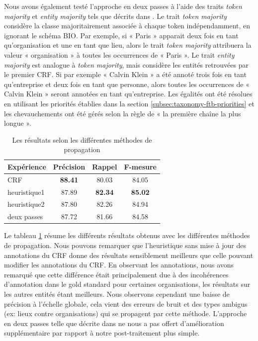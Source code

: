 \documentclass[12pt,a4paper,times,twoside,openright]{report}
\begin{document}
Nous avons également testé l'approche en deux passes à l'aide des traits \emph{token majority} et \emph{entity majority} tels que décrits dans \citet{krishnan2006effective,mao2007using,ratinov2009design}. Le trait \textit{token majority} considère la classe majoritairement associée à chaque token indépendamment, en ignorant le schéma BIO. Par exemple, si « Paris » apparait deux fois en tant qu'organisation et une en tant que lieu, alors le trait \textit{token majority} attribuera la valeur « organisation » à toutes les occurrences de « Paris ». Le trait \textit{entity majority} est analogue à \textit{token majority}, mais considère les entités retrouvées par le premier CRF. Si par exemple « Calvin Klein » a été annoté trois fois en tant qu'entreprise et deux fois en tant que personne, alors toutes les occurrences de « Calvin Klein » seront annotées en tant qu'entreprise. Les égalités ont été résolues en utilisant les priorités établies dans la section \ref{subsec:taxonomy-ftb-priorities} et les chevauchements ont été gérés selon la règle de « la première chaîne la plus longue ».

\begin{table}[ht!]
\centering
\begin{tabular}{|l|ccc|}
\hline
Expérience   & Précision & Rappel & F-mesure \\
\hline
CRF          & \textbf{88.41} & 80.03 & 84.05 \\
heuristique1 & 87.89 & \textbf{82.34} & \textbf{85.02} \\
heuristique2 & 87.80 & 82.26 & 84.94 \\
deux passes  & 87.72 & 81.66 & 84.58 \\
\hline
\end{tabular}
\caption{Les résultats selon les différentes méthodes de propagation}
\label{tab:CRF-propagation}
\end{table}

Le tableau \ref{tab:CRF-propagation} résume les différents résultats obtenus avec les différentes méthodes de propagation. Nous pouvons remarquer que l'heuristique sans mise à jour des annotations du CRF donne des résultats sensiblement meilleurs que celle pouvant modifier les annotations du CRF. En observant les annotations, nous avons remarqué que cette différence était principalement due à des incohérences d'annotation dans le gold standard pour certaines organisations, les résultats sur les autres entités étant meilleurs. Nous observons cependant une baisse de précision à l'échelle globale, cela vient des erreurs de bruit et des types ambigus (ex: lieux contre organisations) qui se propagent par cette méthode. L'approche en deux passes telle que décrite dans \citet{krishnan2006effective,mao2007using,ratinov2009design} ne nous a pas offert d'amélioration supplémentaire par rapport à notre post-traitement plus simple.
\end{document}
